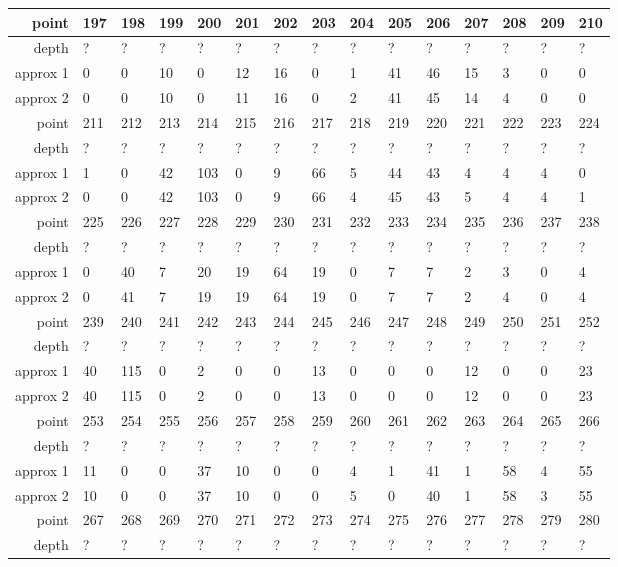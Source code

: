 \begin{center}
\begin{supertabular}{|r|l l l l l l l l l l l l l l|}
\hline
point & 197 & 198 & 199 & 200 & 201 & 202 & 203 & 204 & 205 & 206 & 207 & 208 & 209 & 210 \\
\hline
depth & ? & ? & ? & ? & ? & ? & ? & ? & ? & ? & ? & ? & ? & ? \\
approx 1 & 0 & 0 & 10 & 0 & 12 & 16 & 0 & 1 & 41 & 46 & 15 & 3 & 0 & 0 \\
approx 2 & 0 & 0 & 10 & 0 & 11 & 16 & 0 & 2 & 41 & 45 & 14 & 4 & 0 & 0 \\
\hline
point & 211 & 212 & 213 & 214 & 215 & 216 & 217 & 218 & 219 & 220 & 221 & 222 & 223 & 224 \\
\hline
depth & ? & ? & ? & ? & ? & ? & ? & ? & ? & ? & ? & ? & ? & ? \\
approx 1 & 1 & 0 & 42 & 103 & 0 & 9 & 66 & 5 & 44 & 43 & 4 & 4 & 4 & 0 \\
approx 2 & 0 & 0 & 42 & 103 & 0 & 9 & 66 & 4 & 45 & 43 & 5 & 4 & 4 & 1 \\
\hline
point & 225 & 226 & 227 & 228 & 229 & 230 & 231 & 232 & 233 & 234 & 235 & 236 & 237 & 238 \\
\hline
depth & ? & ? & ? & ? & ? & ? & ? & ? & ? & ? & ? & ? & ? & ? \\
approx 1 & 0 & 40 & 7 & 20 & 19 & 64 & 19 & 0 & 7 & 7 & 2 & 3 & 0 & 4 \\
approx 2 & 0 & 41 & 7 & 19 & 19 & 64 & 19 & 0 & 7 & 7 & 2 & 4 & 0 & 4 \\
\hline
point & 239 & 240 & 241 & 242 & 243 & 244 & 245 & 246 & 247 & 248 & 249 & 250 & 251 & 252 \\
\hline
depth & ? & ? & ? & ? & ? & ? & ? & ? & ? & ? & ? & ? & ? & ? \\
approx 1 & 40 & 115 & 0 & 2 & 0 & 0 & 13 & 0 & 0 & 0 & 12 & 0 & 0 & 23 \\
approx 2 & 40 & 115 & 0 & 2 & 0 & 0 & 13 & 0 & 0 & 0 & 12 & 0 & 0 & 23 \\
\hline
point & 253 & 254 & 255 & 256 & 257 & 258 & 259 & 260 & 261 & 262 & 263 & 264 & 265 & 266 \\
\hline
depth & ? & ? & ? & ? & ? & ? & ? & ? & ? & ? & ? & ? & ? & ? \\
approx 1 & 11 & 0 & 0 & 37 & 10 & 0 & 0 & 4 & 1 & 41 & 1 & 58 & 4 & 55 \\
approx 2 & 10 & 0 & 0 & 37 & 10 & 0 & 0 & 5 & 0 & 40 & 1 & 58 & 3 & 55 \\
\hline
point & 267 & 268 & 269 & 270 & 271 & 272 & 273 & 274 & 275 & 276 & 277 & 278 & 279 & 280 \\
\hline
depth & ? & ? & ? & ? & ? & ? & ? & ? & ? & ? & ? & ? & ? & ? \\

\end{supertabular}
\end{center}
